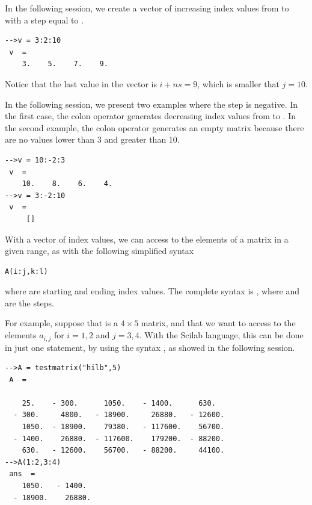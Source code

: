 In the following session, we create 
a vector of increasing index values from  to  with a 
step equal to .
\lstset{language=scilabscript}
\begin{lstlisting}
-->v = 3:2:10
 v  =
    3.    5.    7.    9.  
\end{lstlisting}
Notice that the last value in the vector  is $i+ns=9$,
which is smaller that $j=10$.

In the following session, we present two examples where the 
step is negative. In the first case, the colon operator generates 
decreasing index values from  to . 
In the second example, the colon operator generates an
empty matrix because there are no values lower than 3 and 
greater than 10.
\lstset{language=scilabscript}
\begin{lstlisting}
-->v = 10:-2:3
 v  =
    10.    8.    6.    4.  
-->v = 3:-2:10
 v  =
     []
\end{lstlisting}

With a vector of index values, we can access to the elements of 
a matrix in a given range, as with the following simplified syntax
\lstset{language=scilabscript}
\begin{lstlisting}
A(i:j,k:l)
\end{lstlisting}
where  are starting and ending index values.
The complete syntax is ,
where  and  are the steps.

For example, suppose that  is a $4\times 5$ matrix, and that 
we want to access to the elements $a_{i,j}$ for $i=1,2$ and 
$j=3,4$. With the Scilab language, this can be done in
just one statement, by using the syntax ,
as showed in the following session.
\lstset{language=scilabscript}
\begin{lstlisting}
-->A = testmatrix("hilb",5)
 A  =
 
    25.    - 300.      1050.    - 1400.      630.    
  - 300.     4800.   - 18900.     26880.   - 12600.  
    1050.  - 18900.    79380.   - 117600.    56700.  
  - 1400.    26880.  - 117600.    179200.  - 88200.  
    630.   - 12600.    56700.   - 88200.     44100.  
-->A(1:2,3:4)
 ans  =
    1050.   - 1400.   
  - 18900.    26880.  
\end{lstlisting}

